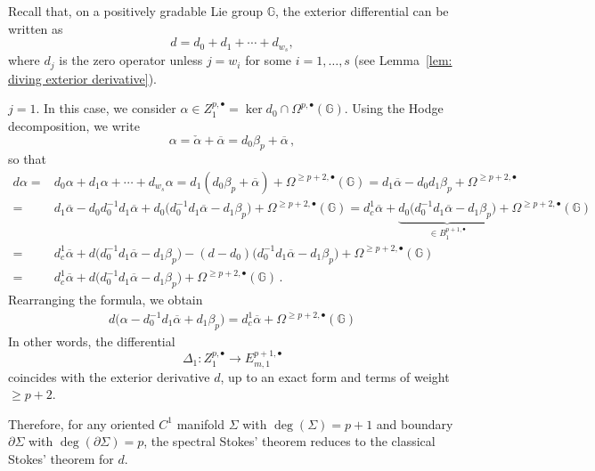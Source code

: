 \documentclass[dvipsnames]{amsart}
\theoremstyle{definition}
\theoremstyle{definition}
\numberwithin{equation}{section}
\newcommand{\G}{\mathbb{G}}
\begin{document}
Recall that, on a positively gradable Lie group $\mathbb{G}$, the exterior differential can be written as
\[
d = d_0 + d_1 + \cdots + d_{w_s},
\]
where $d_j$ is the zero operator unless $j=w_i$ for some $i=1,\ldots,s$ (see Lemma~\ref{lem: diving exterior derivative}).



\medskip
$j=1$. 
In this case, we consider $\alpha \in Z_1^{p,\bullet} = \ker d_0 \cap \Omega^{p,\bullet}(\mathbb{G})$. Using the Hodge decomposition, we write
\[
\alpha = \check{\alpha} + \overline{\alpha} = d_0 \beta_p + \overline{\alpha}\,,
\]
so that
\begin{align*}
    d\alpha=&d_0\alpha+d_1\alpha+\cdots+d_{w_s}\alpha=d_1(d_0\beta_p+\overline{\alpha})+\Omega^{\ge p+2,\bullet}(\G)=d_1\overline{\alpha}-d_0d_1\beta_p+\Omega^{\ge p+2,\bullet}\\=&
    d_1\overline{\alpha}-d_0d_0^{-1}d_1\overline{\alpha}+d_0\big(d_0^{-1}d_1\overline{\alpha}-d_1\beta_p\big)+\Omega^{\ge p+2,\bullet}(\G)=d_c^1\overline{\alpha}+\underbrace{d_0\big(d_0^{-1}d_1\overline{\alpha}-d_1\beta_p\big)}_{\in B_1^{p+1,\bullet}}+\Omega^{\ge p+2,\bullet}(\G)\\=&d_c^1\overline{\alpha}+d\big(d_0^{-1}d_1\overline{\alpha}-d_1\beta_p\big)-(d-d_0)\big(d_0^{-1}d_1\overline{\alpha}-d_1\beta_p\big)+\Omega^{\ge p+2,\bullet}(\G)\\=&d_c^1\overline{\alpha}+d\big(d_0^{-1}d_1\overline{\alpha}-d_1\beta_p\big)+\Omega^{\ge p+2,\bullet}(\G)\,.
\end{align*} 
Rearranging the formula, we obtain
\begin{align*}
    d\big(\alpha-d_0^{-1}d_1\overline{\alpha}+d_1\beta_p\big)=d_c^1\overline{\alpha}+\Omega^{\ge p+2,\bullet}(\G)
\end{align*}
In other words, the differential
\[
\Delta_1 \colon Z_1^{p,\bullet} \longrightarrow E_{m,1}^{p+1,\bullet}
\]
coincides with the exterior derivative $d$, up to an exact form and terms of weight $\ge p+2$.

Therefore, for any oriented $C^1$ manifold $\Sigma$ with $\deg(\Sigma)=p+1$ and boundary $\partial\Sigma$ with $\deg(\partial\Sigma)=p$, the spectral Stokes' theorem reduces to the classical Stokes' theorem for $d$.
\end{document}
